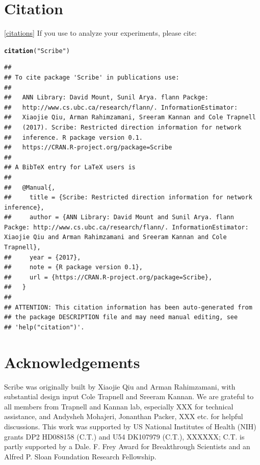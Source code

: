 \documentclass[10pt,oneside]{article}\usepackage[]{graphicx}\usepackage[]{color}
\makeatletter
\newcommand{\hlstr}[1]{\textcolor[rgb]{0.192,0.494,0.8}{#1}}%
\newcommand{\hlstd}[1]{\textcolor[rgb]{0.345,0.345,0.345}{#1}}%
\newcommand{\hlkwd}[1]{\textcolor[rgb]{0.737,0.353,0.396}{\textbf{#1}}}%
\newenvironment{kframe}{%
 \def\at@end@of@kframe{}%
 \ifinner\ifhmode%
  \def\at@end@of@kframe{\end{minipage}}%
  \begin{minipage}{\columnwidth}%
 \fi\fi%
 \def\FrameCommand##1{\hskip\@totalleftmargin \hskip-\fboxsep
 \colorbox{shadecolor}{##1}\hskip-\fboxsep
     \hskip-\linewidth \hskip-\@totalleftmargin \hskip\columnwidth}%
 \MakeFramed {\advance\hsize-\width
   \@totalleftmargin\z@ \linewidth\hsize
   \@setminipage}}%
 {\par\unskip\endMakeFramed%
 \at@end@of@kframe}
\newenvironment{knitrout}{}{} %
\makeatother
\begin{document}
 \section{Citation}\ref{citations}
 If you use  to analyze your experiments, please cite:
\begin{knitrout}
\color{fgcolor}\begin{kframe}
\begin{alltt}
\hlkwd{citation}\hlstd{(}\hlstr{"Scribe"}\hlstd{)}
\end{alltt}
\begin{verbatim}
## 
## To cite package 'Scribe' in publications use:
## 
##   ANN Library: David Mount, Sunil Arya. flann Packge:
##   http://www.cs.ubc.ca/research/flann/. InformationEstimator:
##   Xiaojie Qiu, Arman Rahimzamani, Sreeram Kannan and Cole Trapnell
##   (2017). Scribe: Restricted direction information for network
##   inference. R package version 0.1.
##   https://CRAN.R-project.org/package=Scribe
## 
## A BibTeX entry for LaTeX users is
## 
##   @Manual{,
##     title = {Scribe: Restricted direction information for network inference},
##     author = {ANN Library: David Mount and Sunil Arya. flann Packge: http://www.cs.ubc.ca/research/flann/. InformationEstimator: Xiaojie Qiu and Arman Rahimzamani and Sreeram Kannan and Cole Trapnell},
##     year = {2017},
##     note = {R package version 0.1},
##     url = {https://CRAN.R-project.org/package=Scribe},
##   }
## 
## ATTENTION: This citation information has been auto-generated from
## the package DESCRIPTION file and may need manual editing, see
## 'help("citation")'.
\end{verbatim}
\end{kframe}
\end{knitrout}

 \section{Acknowledgements}

Scribe was originally built by Xiaojie Qiu and Arman Rahimzamani, with substantial design input Cole Trapnell and Sreeram Kannan. We are grateful to all members from Trapnell and Kannan lab, especially XXX for technical assistance, and Andysheh Mohajeri, Jonanthan Packer, XXX etc. for helpful discussions. This work was supported by  US National Institutes of Health (NIH) grants DP2 HD088158 (C.T.) and U54 DK107979 (C.T.), XXXXXX; C.T. is partly supported by a Dale. F. Frey Award for Breakthrough Scientists and an Alfred P. Sloan Foundation Research Fellowship.
\end{document}
